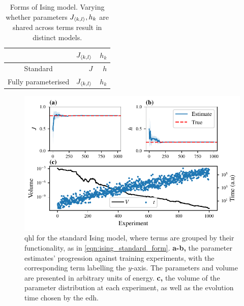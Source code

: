 \begin{table}[h]
\begin{center}
    \begin{tabular}{crr}
         & $J_{{ \langle k, l \rangle }}$  & $h_{k}$ \\
        \hline
        Standard & $J$ & $h$ \\
        Fully parameterised & $J_{{ \langle k, l \rangle }}$ & $h_{k}$
    \end{tabular}
\end{center}
\caption[Forms of Ising model]{Forms of Ising model. Varying whether parameters $J_{{ \langle k, l \rangle }}, h_k$ are shared 
    across terms result in distinct models. 
}
\label{table:ising_models}
\end{table}

\par 

\begin{figure}[t]
\begin{center}
    \includegraphics{theoretical_study/figures/standard_ising_qhl.pdf}
\end{center}

\caption[Quantum Hamiltonian learning for the standard Ising model]{
    \Acrlong{qhl} for the standard Ising model, where terms are grouped by their functionality, 
    as in \cref{eqn:ising_standard_form}. 
    \textbf{a-b,} the parameter estimates' progression against training \glspl{experiment}, 
        with the corresponding term labelling the $y$-axis. 
    The parameters and volume are presented in arbitrary units of energy. 
    \textbf{c,} the \gls{volume} of the parameter distribution at each experiment, 
        as well as the evolution time chosen by the \acrlong{edh}. 
    \figtableref
}
\label{fig:ising_two_param_learning}
\end{figure}

